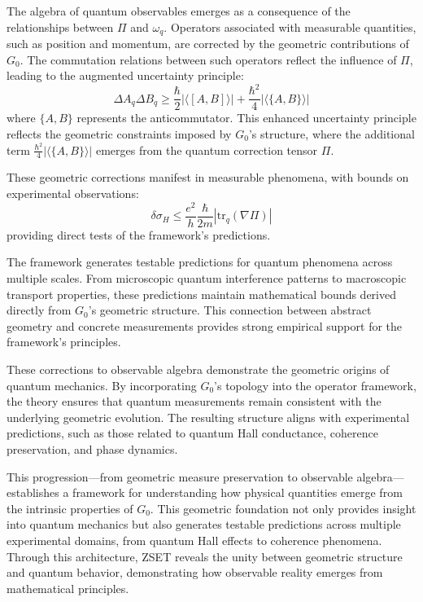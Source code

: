 \documentclass[10pt]{article}
\begin{document}
The algebra of quantum observables emerges as a consequence of the relationships between \( \Pi \) and \( \omega_q \). Operators associated with measurable quantities, such as position and momentum, are corrected by the geometric contributions of $G_0$. The commutation relations between such operators reflect the influence of \( \Pi \), leading to the augmented uncertainty principle:
\[
   \Delta A_q \Delta B_q \geq \frac{\hbar}{2}|\langle [A, B] \rangle| + \frac{\hbar^2}{4}|\langle \{A, B\} \rangle|
\]
where \( \{A, B\} \) represents the anticommutator. This enhanced uncertainty principle reflects the geometric constraints imposed by $G_0$'s structure, where the additional term \( \frac{\hbar^2}{4}|\langle \{A, B\} \rangle| \) emerges from the quantum correction tensor \( \Pi \).

These geometric corrections manifest in measurable phenomena, with bounds on experimental observations:
\[
   \delta\sigma_H \leq \frac{e^2}{h}\frac{\hbar}{2m}|\text{tr}_q(\nabla\Pi)|
\]
providing direct tests of the framework's predictions.

The framework generates testable predictions for quantum phenomena across multiple scales. From microscopic quantum interference patterns to macroscopic transport properties, these predictions maintain mathematical bounds derived directly from $G_0$'s geometric structure. This connection between abstract geometry and concrete measurements provides strong empirical support for the framework's principles.

These corrections to observable algebra demonstrate the geometric origins of quantum mechanics. By incorporating $G_0$'s topology into the operator framework, the theory ensures that quantum measurements remain consistent with the underlying geometric evolution. The resulting structure aligns with experimental predictions, such as those related to quantum Hall conductance, coherence preservation, and phase dynamics.

This progression—from geometric measure preservation to observable algebra—establishes a framework for understanding how physical quantities emerge from the intrinsic properties of $G_0$. This geometric foundation not only provides insight into quantum mechanics but also generates testable predictions across multiple experimental domains, from quantum Hall effects to coherence phenomena. Through this architecture, ZSET reveals the unity between geometric structure and quantum behavior, demonstrating how observable reality emerges from mathematical principles.
\end{document}
